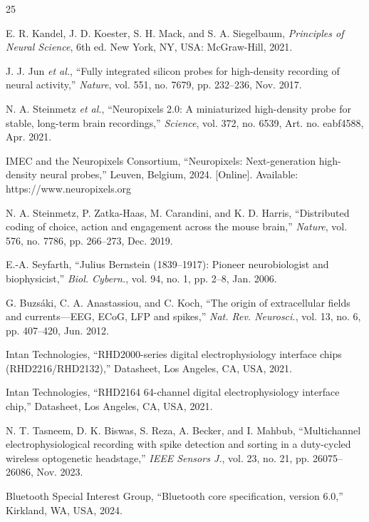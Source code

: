 \documentclass[11pt]{article}
\begin{document}
\clearpage
{}
{}
\begin{thebibliography}{25}

 E. R. Kandel, J. D. Koester, S. H. Mack, and S. A. Siegelbaum, \emph{Principles of Neural Science}, 6th ed. New York, NY, USA: McGraw-Hill, 2021.

 J. J. Jun \emph{et al.}, ``Fully integrated silicon probes for high-density recording of neural activity,'' \emph{Nature}, vol. 551, no. 7679, pp. 232--236, Nov. 2017.

 N. A. Steinmetz \emph{et al.}, ``Neuropixels 2.0: A miniaturized high-density probe for stable, long-term brain recordings,'' \emph{Science}, vol. 372, no. 6539, Art. no. eabf4588, Apr. 2021.

 IMEC and the Neuropixels Consortium, ``Neuropixels: Next-generation high-density neural probes,'' Leuven, Belgium, 2024. [Online]. Available: https://www.neuropixels.org

 N. A. Steinmetz, P. Zatka-Haas, M. Carandini, and K. D. Harris, ``Distributed coding of choice, action and engagement across the mouse brain,'' \emph{Nature}, vol. 576, no. 7786, pp. 266--273, Dec. 2019.

 E.-A. Seyfarth, ``Julius Bernstein (1839--1917): Pioneer neurobiologist and biophysicist,'' \emph{Biol. Cybern.}, vol. 94, no. 1, pp. 2--8, Jan. 2006.

 G. Buzs\'aki, C. A. Anastassiou, and C. Koch, ``The origin of extracellular fields and currents---EEG, ECoG, LFP and spikes,'' \emph{Nat. Rev. Neurosci.}, vol. 13, no. 6, pp. 407--420, Jun. 2012.

 Intan Technologies, ``RHD2000-series digital electrophysiology interface chips (RHD2216/RHD2132),'' Datasheet, Los Angeles, CA, USA, 2021.

 Intan Technologies, ``RHD2164 64-channel digital electrophysiology interface chip,'' Datasheet, Los Angeles, CA, USA, 2021.

 N. T. Tasneem, D. K. Biswas, S. Reza, A. Becker, and I. Mahbub, ``Multichannel electrophysiological recording with spike detection and sorting in a duty-cycled wireless optogenetic headstage,'' \emph{IEEE Sensors J.}, vol. 23, no. 21, pp. 26075--26086, Nov. 2023.

 Bluetooth Special Interest Group, ``Bluetooth core specification, version 6.0,'' Kirkland, WA, USA, 2024.


\end{thebibliography}
\end{document}
